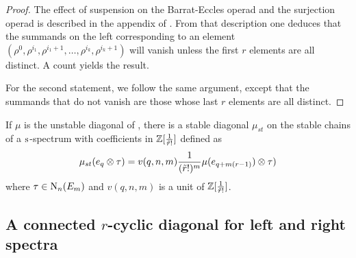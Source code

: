 \begin{proof}
 The effect of suspension on the Barrat-Eccles operad and the surjection operad is described in the appendix of \cite{berger2004combinatorial}. From that description one deduces that the summands on the left corresponding to an element $(\rho^0,\rho^{i_1},\rho^{i_1+1},\dots,\rho^{i_k},\rho^{i_k+1})$ will vanish unless the first $r$ elements are all distinct. A count yields the result.

 For the second statement, we follow the same argument, except that the summands that do not vanish are those whose last $r$ elements are all distinct.
\end{proof}

 If $\mu$ is the unstable diagonal of \cite{medina2021may_st}, there is a stable diagonal $\mu_{st}$ on the stable chains of a $\sus{}$-spectrum with coefficients in $\bZ[\frac{1}{\tilde{r}!}]$ defined as
 \[
 \mu_{st}(e_q \ot \tau) = v(q,n,m)\frac{1}{(\tilde{r}!)^{m}}\mu(e_{q+m(r-1)}) \ot \tau)
 \]
 where $\tau\in \chains[n](E_m)$ and $v(q,n,m)$ is a unit of $\bZ[\frac{1}{\tilde{r}!}]$.

\subsection{A connected $r$-cyclic diagonal for left and right spectra}


